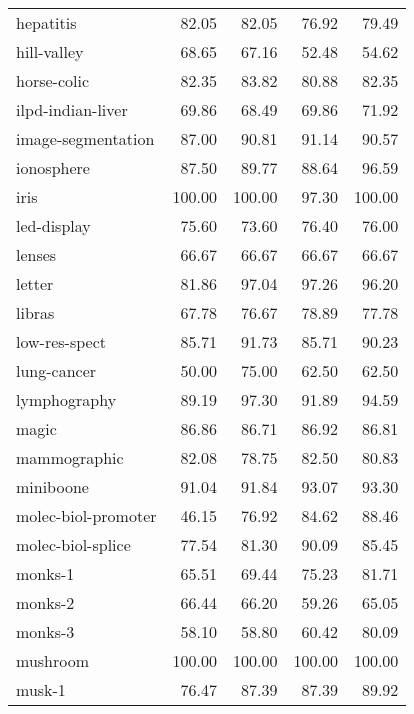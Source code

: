 \begin{longtable}{lrrrr}
                     hepatitis &   82.05 &    82.05 &  76.92 &  79.49 \\
                   hill-valley &   68.65 &    67.16 &  52.48 &  54.62 \\
                   horse-colic &   82.35 &    83.82 &  80.88 &  82.35 \\
             ilpd-indian-liver &   69.86 &    68.49 &  69.86 &  71.92 \\
            image-segmentation &   87.00 &    90.81 &  91.14 &  90.57 \\
                    ionosphere &   87.50 &    89.77 &  88.64 &  96.59 \\
                          iris &  100.00 &   100.00 &  97.30 & 100.00 \\
                   led-display &   75.60 &    73.60 &  76.40 &  76.00 \\
                        lenses &   66.67 &    66.67 &  66.67 &  66.67 \\
                        letter &   81.86 &    97.04 &  97.26 &  96.20 \\
                        libras &   67.78 &    76.67 &  78.89 &  77.78 \\
                 low-res-spect &   85.71 &    91.73 &  85.71 &  90.23 \\
                   lung-cancer &   50.00 &    75.00 &  62.50 &  62.50 \\
                  lymphography &   89.19 &    97.30 &  91.89 &  94.59 \\
                         magic &   86.86 &    86.71 &  86.92 &  86.81 \\
                  mammographic &   82.08 &    78.75 &  82.50 &  80.83 \\
                     miniboone &   91.04 &    91.84 &  93.07 &  93.30 \\
           molec-biol-promoter &   46.15 &    76.92 &  84.62 &  88.46 \\
             molec-biol-splice &   77.54 &    81.30 &  90.09 &  85.45 \\
                       monks-1 &   65.51 &    69.44 &  75.23 &  81.71 \\
                       monks-2 &   66.44 &    66.20 &  59.26 &  65.05 \\
                       monks-3 &   58.10 &    58.80 &  60.42 &  80.09 \\
                      mushroom &  100.00 &   100.00 & 100.00 & 100.00 \\
                        musk-1 &   76.47 &    87.39 &  87.39 &  89.92 \\

\end{longtable}
